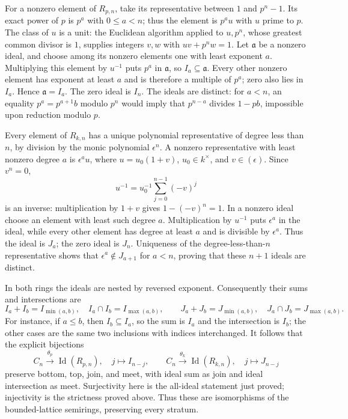 For a nonzero element of \(R_{p,n}\), take its representative
between \(1\) and \(p^n-1\). Its exact power of \(p\)
is \(p^a\) with \(0\le a<n\); thus the element is \(p^a u\)
with \(u\) prime to \(p\). The class of \(u\) is a unit:
the Euclidean algorithm applied to \(u,p^n\), whose greatest
common divisor is \(1\), supplies integers \(v,w\) with
\(uv+p^nw=1\). Let \(\mathfrak a\) be a nonzero ideal,
and choose among its nonzero elements one with least
exponent \(a\). Multiplying this element by \(u^{-1}\)
puts \(p^a\) in \(\mathfrak a\), so \(I_a\subseteq\mathfrak a\).
Every other nonzero element has exponent at least \(a\)
and is therefore a multiple of \(p^a\); zero also lies
in \(I_a\). Hence \(\mathfrak a=I_a\). The zero ideal
is \(I_n\). The ideals are distinct: for \(a<n\),
an equality \(p^a=p^{a+1}b\) modulo \(p^n\) would imply
that \(p^{n-a}\) divides \(1-pb\), impossible upon
reduction modulo \(p\).

Every element of \(R_{k,n}\) has a unique polynomial
representative of degree less than \(n\), by division
by the monic polynomial \(\epsilon^n\). A nonzero
representative with least nonzero degree \(a\) is
\(\epsilon^a u\), where \(u=u_0(1+v)\), \(u_0\in k^\times\),
and \(v\in(\epsilon)\). Since \(v^n=0\),
\[
        u^{-1}=u_0^{-1}\sum_{j=0}^{n-1}(-v)^j             \tag{MFC.39}
\]
is an inverse: multiplication by \(1+v\) gives
\(1-(-v)^n=1\).
In a nonzero ideal choose an element with least such
degree \(a\). Multiplication by \(u^{-1}\) puts
\(\epsilon^a\) in the ideal, while every other element
has degree at least \(a\) and is divisible by
\(\epsilon^a\). Thus the ideal is \(J_a\); the zero
ideal is \(J_n\). Uniqueness of the degree-less-than-\(n\)
representative shows that
\(\epsilon^a\notin J_{a+1}\) for \(a<n\), proving that
these \(n+1\) ideals are distinct.

In both rings the ideals are nested by reversed exponent.
Consequently their sums and intersections are
\[
 I_a+I_b=I_{\min(a,b)},\quad I_a\cap I_b=I_{\max(a,b)},
 \qquad
 J_a+J_b=J_{\min(a,b)},\quad J_a\cap J_b=J_{\max(a,b)}.
                                                               \tag{MFC.40}
\]
For instance, if \(a\le b\), then \(I_b\subseteq I_a\),
so the sum is \(I_a\) and the intersection is \(I_b\);
the other cases are the same two inclusions with indices
interchanged. It follows that the explicit bijections
\[
 C_n\xrightarrow{\ \theta_p\ }\operatorname{Id}(R_{p,n}),
       \quad j\mapsto I_{n-j},\qquad
 C_n\xrightarrow{\ \theta_k\ }\operatorname{Id}(R_{k,n}),
       \quad j\mapsto J_{n-j}                             \tag{MFC.41}
\]
preserve bottom, top, join, and meet, with ideal sum as
join and ideal intersection as meet. Surjectivity here is
the all-ideal statement just proved; injectivity is the
strictness proved above. Thus these are isomorphisms of
the bounded-lattice semirings, preserving every stratum.

